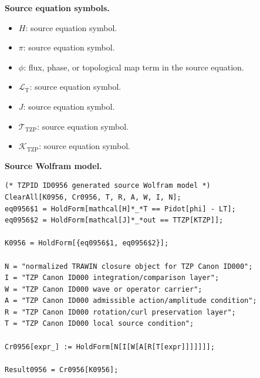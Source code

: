 \begin{minipage}[t]{0.49\linewidth}
\begingroup
\small
\raggedright
\textbf{Source equation symbols.}\par
\begin{itemize}[leftmargin=1.35em,itemsep=1pt,topsep=1pt,parsep=0pt]
    \item $H$: source equation symbol.
    \item $\pi$: source equation symbol.
    \item $\phi$: flux, phase, or topological map term in the source equation.
    \item $\mathcal{L}_{\mathrm{T}}$: source equation symbol.
    \item $J$: source equation symbol.
    \item $\mathcal{T}_{\mathrm{TZP}}$: source equation symbol.
    \item $\mathcal{K}_{\mathrm{TZP}}$: source equation symbol.
\end{itemize}
\endgroup
\end{minipage}\hfill
\begin{minipage}[t]{0.47\linewidth}
\begingroup
\scriptsize
\raggedright
\textbf{Source Wolfram model.}\par
\begin{Verbatim}[fontsize=\tiny,breaklines=true,breakanywhere=true]
(* TZPID ID0956 generated source Wolfram model *)
ClearAll[K0956, Cr0956, T, R, A, W, I, N];
eq0956$1 = HoldForm[mathcal[H]*_*T == Pidot[phi] - LT];
eq0956$2 = HoldForm[mathcal[J]*_*out == TTZP[KTZP]];

K0956 = HoldForm[{eq0956$1, eq0956$2}];

N = "normalized TRAWIN closure object for TZP Canon ID000";
I = "TZP Canon ID000 integration/comparison layer";
W = "TZP Canon ID000 wave or operator carrier";
A = "TZP Canon ID000 admissible action/amplitude condition";
R = "TZP Canon ID000 rotation/curl preservation layer";
T = "TZP Canon ID000 local source condition";

Cr0956[expr_] := HoldForm[N[I[W[A[R[T[expr]]]]]]];

Result0956 = Cr0956[K0956];
\end{Verbatim}
\endgroup
\end{minipage}

